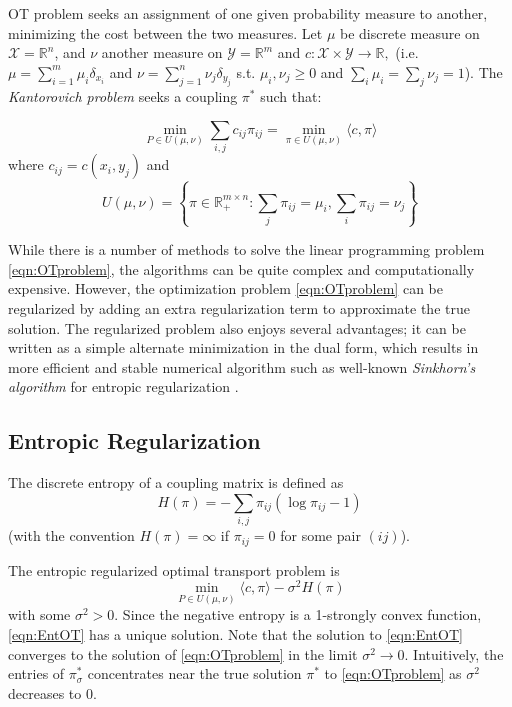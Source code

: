 \documentclass{article}
\newcommand{\R}{\mathbb{R}}
\begin{document}
OT problem seeks an assignment of one given probability measure to another, minimizing the cost between the two measures. 
Let $\mu$ be discrete measure on $\mathcal{X} = \R^n$, and $\nu$ another measure on $\mathcal{Y} = \R^m$ and $c:\mathcal{X} \times \mathcal{Y} \to \R,$
(i.e. $\mu = \sum_{i=1}^m \mu_i\delta_{x_i}$ and $\nu = \sum_{j=1}^n \nu_j\delta_{y_j} $ s.t. $\mu_i, \nu_j \ge 0$ and $\sum_i \mu_i = \sum_j\nu_j =1$). 
The \textit{Kantorovich problem} seeks a coupling $\pi^*$ such that:

\begin{equation}\label{eqn:OTproblem}
    \min_{P\in U(\mu, \nu)} \sum_{i, j} c_{i j} \pi_{i j} = \min_{\pi\in U(\mu, \nu)} \langle c, \pi \rangle
\end{equation}
where $c_{ij} = c(x_i, y_j)$ and
\begin{equation}\label{eqn:discreteCouplingSpace}
    U(\mu, \nu) = \left\{\pi\in\R_+^{m\times n} : \sum_j \pi_{i j} = \mu_i,  \sum_i \pi_{i j} = \nu_j \right\}
\end{equation}

While there is a number of methods to solve the linear programming problem \eqref{eqn:OTproblem}, the algorithms can be quite complex and computationally expensive.
However, the optimization problem \eqref{eqn:OTproblem} can be regularized by adding an extra regularization term to approximate the true solution.  
The regularized problem also enjoys several advantages;
it can be written as a simple alternate minimization in the dual form, which results in more efficient and stable numerical algorithm such as well-known \textit{Sinkhorn's algorithm} for entropic regularization \cite{peyre2019computational}.

\subsection{Entropic Regularization}\label{sec:Entropic}

The discrete entropy of a coupling matrix is defined as
\begin{equation}\label{eqn:DiscreteEntropy}
    H(\pi) = -\sum_{i,j} \pi_{i j}\left( \log \pi_{ij} -1 \right)
\end{equation}
(with the convention $H (\pi) = \infty$ if $ \pi_{ij} = 0$ for some pair $(i j)$). 

The entropic regularized optimal transport problem is
\begin{equation}\label{eqn:EntOT}
    \min_{P\in U(\mu, \nu)} \langle c, \pi \rangle - \sigma^2 H(\pi)
\end{equation}
with some $\sigma^2>0.$ 
Since the negative entropy is a 1-strongly convex function, \eqref{eqn:EntOT} has a unique solution. 
Note that the solution to \eqref{eqn:EntOT} converges to the solution of \ref{eqn:OTproblem} in the limit $\sigma^2\to 0$.
Intuitively, the entries of $\pi^*_\sigma$ concentrates near the true solution $\pi^*$ to \eqref{eqn:OTproblem} as $\sigma^2$ decreases to 0.
\end{document}
